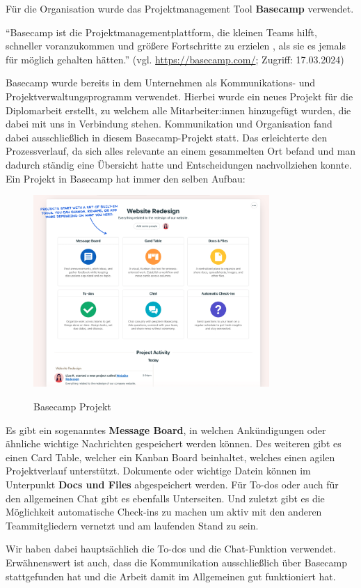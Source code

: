 Für die Organisation wurde das Projektmanagement Tool \textbf{Basecamp} verwendet.

“Basecamp ist die Projektmanagementplattform, die kleinen Teams hilft, schneller voranzukommen und größere Fortschritte zu erzielen , als sie es jemals für möglich gehalten hätten.”
\newline
(vgl. \url{https://basecamp.com/}; Zugriff: 17.03.2024)

Basecamp wurde bereits in dem Unternehmen als Kommunikations- und Projektverwaltungsprogramm verwendet. Hierbei wurde ein neues Projekt für die Diplomarbeit erstellt, zu welchem alle Mitarbeiter:innen hinzugefügt wurden, die dabei mit uns in Verbindung stehen.
Kommunikation und Organisation fand dabei ausschließlich in diesem Basecamp-Projekt statt. Das erleichterte den Prozessverlauf, da sich alles relevante an einem gesammelten Ort befand und man dadurch ständig eine Übersicht hatte und Entscheidungen nachvollziehen konnte.
Ein Projekt in Basecamp hat immer den selben Aufbau:

\begin{figure}[h!]
    \centering
    \includegraphics[width=0.8\textwidth]{pics/basecamp-project-overview.png}
    \caption{Basecamp Projekt}
    \cite{basecamp_project}
    \label{fig:mesh1}
\end{figure}

Es gibt ein sogenanntes \textbf{Message Board}, in welchen Ankündigungen oder ähnliche wichtige Nachrichten gespeichert werden können. Des weiteren gibt es einen Card Table, welcher ein Kanban Board beinhaltet, welches einen agilen Projektverlauf unterstützt. Dokumente oder wichtige Datein können im Unterpunkt \textbf{Docs und Files} abgespeichert werden. Für To-dos oder auch für den allgemeinen Chat gibt es ebenfalls Unterseiten. Und zuletzt gibt es die Möglichkeit automatische Check-ins zu machen um aktiv mit den anderen Teammitgliedern vernetzt und am laufenden Stand zu sein.

Wir haben dabei hauptsächlich die To-dos und die Chat-Funktion verwendet. Erwähnenswert ist auch, dass die Kommunikation ausschließlich über Basecamp stattgefunden hat und die Arbeit damit im Allgemeinen gut funktioniert hat.